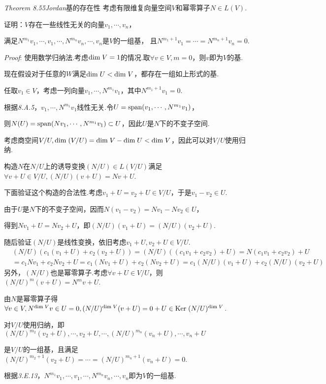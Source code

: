 \textit{Theorem 8.55}\textit{Jordan}{\kaishu 基的存在性}
考虑有限维复向量空间\(V\)和幂零算子\(N \in L(V)\).

证明：\(V\)存在一些线性无关的向量\(v_1,\cdots,v_n\)，

满足\(N^{m_1}v_1,\cdots,v_1,\cdots,N^{m_n}v_n,\cdots,v_n\)是\(V\)的一组基，
且\(N^{m_1+1}v_1=\cdots=N^{m_n+1}v_n=0\).

\textit{Proof}:
使用数学归纳法.考虑\(\mathrm{dim \;} V=1\)的情况.取\(\forall v \in V,m=0\)，则\(v\)即为\(V\)的基.

现在假设对于任意的\(W\)满足\(\mathrm{dim \;} U<\mathrm{dim \;} V\)，都存在一组如上形式的基.

任取\(v_1 \in V\)，考虑一列向量\(v_1,\cdots,N^{m_1}v_1\)，其中\(N^{m_1+1}v_1=0\).

根据\textit{8.A.5}，\(v_1,\cdots,N^{m_1}v_1\)线性无关.令\(U=\mathrm{span} (v_1,\cdots,N^{m_1}v_1)\)，

则\(N(U)=\mathrm{span} (Nv_1,\cdots,N^{m_1}v_1) \subset U\)，因此\(U\)是\(N\)下的不变子空间.

考虑商空间\(V/U,\mathrm{dim \;} (V/U)=\mathrm{dim \;} V-\mathrm{dim \;} U < \mathrm{dim \;} V\)，因此可以对\(V/U\)使用归纳.

构造\(N\)在\(N/U\)上的诱导变换\((N/U) \in L(V/U)\)满足\(\forall v+U \in V/U,(N/U)(v+U)=Nv+U\).

下面验证这个构造的合法性.考虑\(v_1+U=v_2+U \in V/U\)，于是\(v_1-v_2 \in U\).

由于\(U\)是\(N\)下的不变子空间，因而\(N(v_1-v_2)=Nv_1-Nv_2 \in U\)，

得到\(Nv_1+U=Nv_2+U\)，即\((N/U)(v_1+U)=(N/U)(v_2+U)\).

随后验证\((N/U)\)是线性变换，依旧考虑\(v_1+U,v_2+U \in V/U\).
    \begin{align*}
        &(N/U)(c_1(v_1+U)+c_2(v_2+U))=(N/U)((c_1v_1+c_2v_2)+U)=N(c_1v_1+c_2v_2)+U \\
        &=c_1Nv_1+c_2Nv_2+U=c_1(Nv_1+U)+c_2(Nv_2+U)=c_1(N/U)(v_1+U)+c_2(N/U)(v_2+U) 
    \end{align*}
另外，\((N/U)\)也是幂零算子.考虑\(\forall v+U \in V/U\)，则\((N/U)^m(v+U)=N^m v+U\).

由\(N\)是幂零算子得\(\forall v \in V,N^{\mathrm{dim \;} V}v \in U=0,(N/U)^{\mathrm{dim \;} V}(v+U)=0+U \in \mathrm{Ker \;} (N/U)^{\mathrm{dim \;} V}\).

对\(V/U\)使用归纳，即\((N/U)^{m_2}(v_2+U),\cdots,v_2+U,\cdots,(N/U)^{m_n}(v_n+U),\cdots,v_n+U\)

是\(V/U\)的一组基，且满足\((N/U)^{m_2+1}(v_2+U)=\cdots=(N/U)^{m_n+1}(v_n+U)=0\).

根据\textit{3.E.13}，\(N^{m_1}v_1,\cdots,v_1,\cdots,N^{m_n}v_n,\cdots,v_n\)即为\(V\)的一组基.

